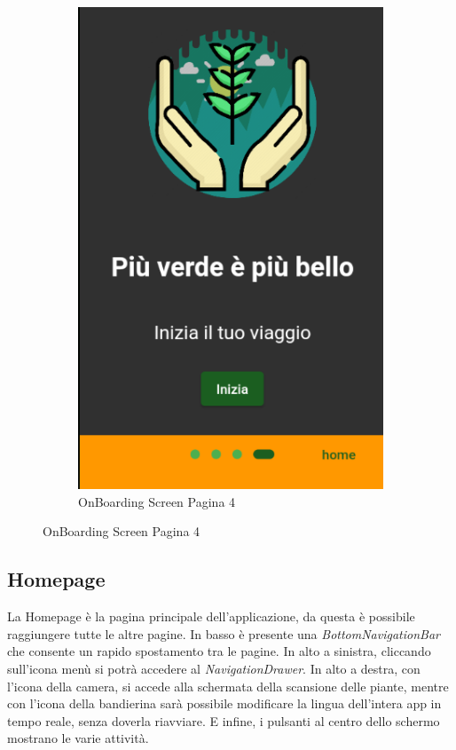\documentclass[a4paper,12pt]{report}
\begin{document}
\begin{figure}[H]
\begin{subfigure}{0.3\textwidth}
	\includegraphics[width=\textwidth]{./images/onboarding/onboarding_screen3_dark.png}
	\caption{OnBoarding Screen Pagina 4}
	\label{fig:onboarding3}
\end{subfigure}
\end{figure}

\subsection{Homepage}

\textsf{\small La Homepage è la pagina principale dell'applicazione, da questa è possibile raggiungere tutte le altre pagine.}
\textsf{\small In basso è presente una \emph{BottomNavigationBar} che consente un rapido spostamento tra le pagine.}
\textsf{\small In alto a sinistra, cliccando sull'icona menù si potrà accedere al \emph{NavigationDrawer}.}
\textsf{\small In alto a destra, con l'icona della camera, si accede alla schermata della scansione delle piante, mentre con l'icona della bandierina sarà possibile modificare la lingua dell'intera app in tempo reale, senza doverla riavviare.}
\textsf{\small E infine, i pulsanti al centro dello schermo mostrano le varie attività.}
\end{document}
